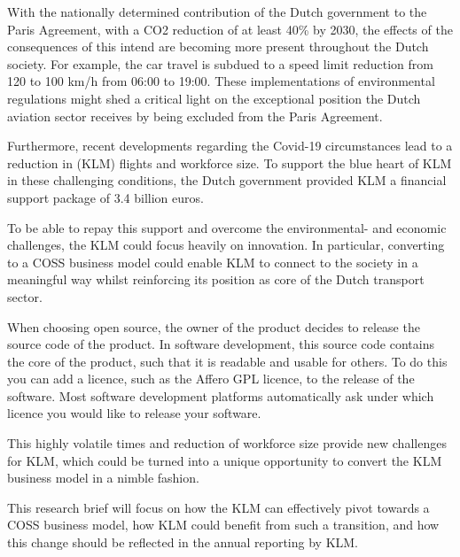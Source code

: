 \documentclass[portrait,a0paper]{rudi-poster}  %
\begin{document}
\begin{rudiblockiintroduction}
    \begin{multicols}{3}
    With the nationally determined contribution of the Dutch government to the Paris Agreement, with a CO2 reduction of at least 40\% by 2030, the effects of the consequences of this intend are becoming more present throughout the Dutch society. For example, the car travel is subdued to a  speed limit reduction from 120 to 100 km/h from 06:00 to 19:00. These implementations of environmental regulations might shed a critical light on the exceptional position the Dutch aviation sector receives by being excluded from the Paris Agreement.
    
    Furthermore, recent developments regarding the Covid-19 circumstances lead to a reduction in (KLM) flights and workforce size. To support the blue heart of KLM in these challenging conditions, the Dutch government provided KLM a financial support package of 3.4 billion euros. 
    
    To be able to repay this support and overcome the environmental- and economic challenges, the KLM could focus heavily on innovation. In particular, converting to a COSS business model could enable KLM to connect to the society in a meaningful way whilst reinforcing its position as core of the Dutch transport sector.
    
    When choosing open source, the owner of the product decides to release the source code of the product. In software development, this source code contains the core of the product, such that it is readable and usable for others. To do this you can add a licence, such as the Affero GPL licence, to the release of the software. Most software development platforms automatically ask under which licence you would like to release your software. 
    
    This highly volatile times and reduction of workforce size provide new challenges for KLM, which could be turned into a unique opportunity to convert the KLM business model in a nimble fashion.
    
    This research brief will focus on how the KLM can effectively pivot towards a COSS business model, how KLM could benefit from such a transition, and how this change should be reflected in the annual reporting by KLM.
    
    
    
    \end{multicols}
\end{rudiblockiintroduction}
\end{document}
